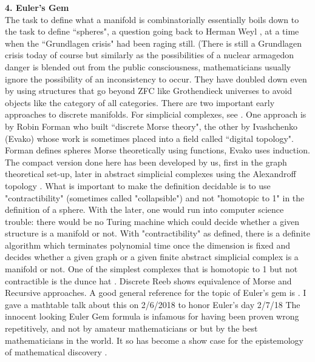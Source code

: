 \documentclass[12pt]{amsart}
\begin{document}
{\bf 4. Euler's Gem} \\

The task to define what a manifold is combinatorially essentially boils down to the task 
to define ``spheres", a question going back to Herman Weyl \cite{Weyl1925}, at a time
when the ``Grundlagen crisis" had been raging still. (There is still a Grundlagen crisis today 
of course but similarly as the possibilities of a nuclear armagedon danger is blended out from
the public consciousness, mathematicians usually ignore the possibility of an inconsistency to 
occur. They have doubled down even by using structures that go beyond ZFC like Grothendieck 
universes to avoid objects like the category of all categories. 
There are two important early approaches to discrete manifolds. For simplicial complexes, see
\cite{JonssonSimplicial, Stanley86,Stanley1996}. 
One approach is by Robin Forman \cite{forman95,forman98,Forman1999,Forman2003}
who built ``discrete Morse theory", the other by Ivashchenko (Evako) \cite{Ivashchenko1993,I94,CYY}
whose work is sometimes placed into a field called ``digital topology". Forman defines spheres 
Morse theoretically using functions, Evako uses induction. The compact version done here has 
been developed by us, first in the graph theoretical set-up, later in abstract simplicial 
complexes using the Alexandroff topology \cite{Alexandroff1937,May2008,KnillTopology2023}. 
What is important to make the definition decidable
is to use "contractibility" (sometimes called "collapsible") and not "homotopic to 1" in the
definition of a sphere. With the later, one would run into computer science trouble: there would
be no Turing machine which could decide whether a given structure is a manifold or not. 
With "contractibility" as defined, there is a definite algorithm which terminates polynomial time
once the dimension is fixed and decides whether a given graph or a given finite abstract simplicial
complex is a manifold or not. One of the simplest complexes that is homotopic to 1 but not contractible
is the dunce hat \cite{ZeemanDunceHat}.
Discrete Reeb \cite{knillreeb} shows equivalence of Morse and Recursive approaches.
A good general reference for the topic of Euler's gem is \cite{Richeson}.
I gave a mathtable talk about this on 2/6/2018 to honor Euler's day 2/7/18 \cite{KnillEulerGem}
The innocent looking Euler Gem formula is infamous for having been proven
wrong repetitively, and not by amateur mathematicians or but by the best mathematicians in the world. 
It so has become a show case for the epistemology of mathematical discovery \cite{lakatos}. 
\end{document}
